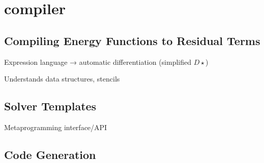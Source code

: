 \section{compiler}
\label{sec:compiler}


\subsection{Compiling Energy Functions to Residual Terms} %
\label{sub:autodiff}

Expression language → automatic differentiation (simplified $D\star$)

Understands data structures, stencils



\subsection{Solver Templates} %
\label{sub:solver_templates}
Metaprogramming interface/API

\subsection{Code Generation} %
\label{sub:codegen}

